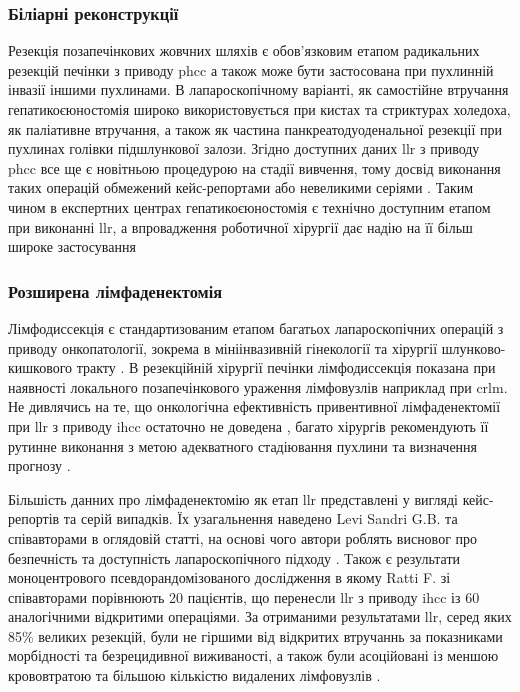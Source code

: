 \begin{refsection}
\subsubsection{Біліарні реконструкції}

Резекція позапечінкових жовчних шляхів є обов'язковим етапом радикальних резекцій печінки з приводу \acrshort{phcc} а також може бути застосована при пухлинній інвазії іншими пухлинами. В лапароскопічному варіанті, як самостійне втручання гепатикоєюностомія широко використовується при кистах та стриктурах холедоха, як паліативне втручання, а також як частина панкреатодуоденальної резекції при пухлинах голівки підшлункової залози. Згідно доступних даних \acrshort{llr} з приводу  \acrshort{phcc} все ще є новітньою процедурою на стадії вивчення, тому досвід виконання таких операцій обмежений кейс-репортами \cite{Lin2014, Machado2014} або невеликими серіями \cite{Ratti2020}. Таким чином в експертних центрах гепатикоєюностомія є технічно доступним етапом при виконанні \acrshort{llr}, а впровадження роботичної хірургії дає надію на її більш широке застосування \cite{Machado2019, Giulianotti2010}

\subsubsection{Розширена лімфаденектомія}

Лімфодиссекція є стандартизованим етапом багатьох лапароскопічних операцій з приводу онкопатології, зокрема в мініінвазивній гінекології та хірургії шлунково-кишкового тракту \cite{Eshuis2018, Jung2019}. В резекційній хірургії печінки лімфодиссекція показана при наявності локального позапечінкового ураження лімфовузлів наприклад при \acrshort{crlm}. Не дивлячись на те, що  онкологічна ефективність привентивної лімфаденектомії при \acrshort{llr} з приводу \acrshort{ihcc} остаточно не доведена \cite{Weber2015, Zhou2019a}, багато хірургів рекомендують її рутинне виконання з метою адекватного стадіювання пухлини та визначення прогнозу \cite{Waisberg2018, Ratti2020a}.

Більшість данних про лімфаденектомію як етап \acrshort{llr} представлені у вигляді кейс-репортів та серій випадків. Їх узагальнення  наведено Levi Sandri G.B. та співавторами в оглядовій статті, на основі чого автори роблять висновог про безпечність та доступність лапароскопічного підходу \cite{Colasanti2017}. Також є результати моноцентрового псевдорандомізованого дослідження в якому Ratti F. зі співавторами порівнюють 20 пацієнтів, що перенесли \acrshort{llr} з приводу \acrshort{ihcc} із 60 аналогічними відкритими операціями. За отриманими результатами \acrshort{llr}, серед яких 85\% великих резекцій, були не гіршими від відкритих втручаннь за показниками морбідності та безрецидивної виживаності, а також були асоційовані із меншою крововтратою та більшою кількістю видалених лімфовузлів \cite{Ratti2016a}. 


\end{refsection}
